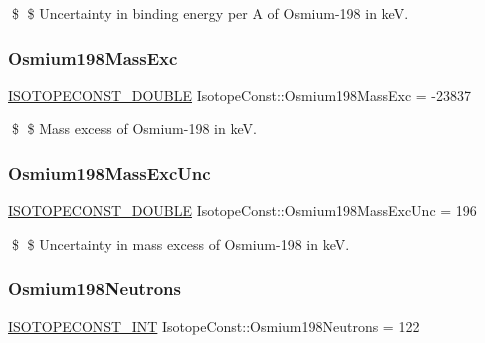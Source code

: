 \$ \$ Uncertainty in binding energy per A of Osmium-\/198 in keV. \mbox{\label{group___isotope_const-_osmium-_os198_ga3fe017c88b3b4982f4136138737026af}} 
\subsubsection{\texorpdfstring{Osmium198\+Mass\+Exc}{Osmium198MassExc}}
{\footnotesize\ttfamily \mbox{\hyperlink{group___isotope_const-_macros_ga8f45a7272ce02c0b4c65c44636ed719a}{I\+S\+O\+T\+O\+P\+E\+C\+O\+N\+S\+T\+\_\+\+D\+O\+U\+B\+LE}} Isotope\+Const\+::\+Osmium198\+Mass\+Exc = -\/23837}

\$ \$ Mass excess of Osmium-\/198 in keV. \mbox{\label{group___isotope_const-_osmium-_os198_gaef97c33f0e8c03667504025375ac9b11}} 
\subsubsection{\texorpdfstring{Osmium198\+Mass\+Exc\+Unc}{Osmium198MassExcUnc}}
{\footnotesize\ttfamily \mbox{\hyperlink{group___isotope_const-_macros_ga8f45a7272ce02c0b4c65c44636ed719a}{I\+S\+O\+T\+O\+P\+E\+C\+O\+N\+S\+T\+\_\+\+D\+O\+U\+B\+LE}} Isotope\+Const\+::\+Osmium198\+Mass\+Exc\+Unc = 196}

\$ \$ Uncertainty in mass excess of Osmium-\/198 in keV. \mbox{\label{group___isotope_const-_osmium-_os198_gad6c79e028b93bdb59ad0773b9bf4b2b3}} 
\subsubsection{\texorpdfstring{Osmium198\+Neutrons}{Osmium198Neutrons}}
{\footnotesize\ttfamily \mbox{\hyperlink{group___isotope_const-_macros_ga5f18360b3e99483a35c32d789e62621c}{I\+S\+O\+T\+O\+P\+E\+C\+O\+N\+S\+T\+\_\+\+I\+NT}} Isotope\+Const\+::\+Osmium198\+Neutrons = 122}

